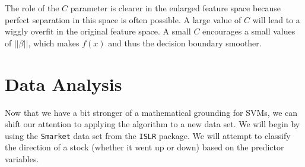 \documentclass[12pt]{article}\usepackage[]{graphicx}\usepackage[]{color}
\begin{document}
The role of the $C$ parameter is clearer in the enlarged feature space because perfect separation in  this space is often possible. A large value of $C$ will lead to a wiggly overfit in the original feature space. A small $C$ encourages a small values of $||\beta||$, which makes $f(x)$ and thus the decision boundary smoother.

\newpage

\section{Data Analysis}

Now that we have a bit stronger of a mathematical grounding for SVMs, we can shift our attention to applying the algorithm to a new data set. We will begin by using the \texttt{Smarket} data set from the \texttt{ISLR} package. We will attempt to classify the direction of a stock (whether it went up or down) based on the predictor variables.
\end{document}
